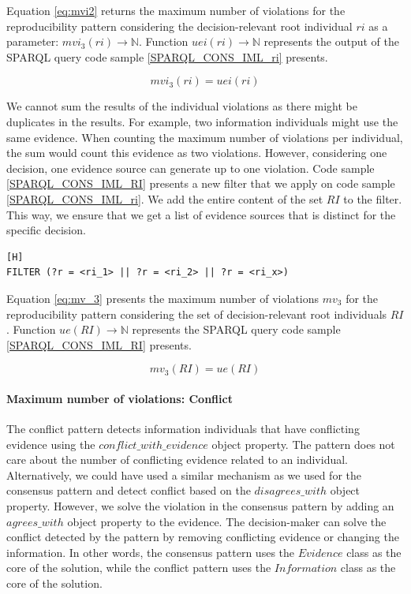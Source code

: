 Equation \ref{eq:mvi2} returns the maximum number of violations for the reproducibility pattern considering the decision-relevant root individual $ri$ as a parameter: $mvi_3(ri) \rightarrow \mathbb{N}$. Function $uei(ri) \rightarrow \mathbb{N}$ represents the output of the SPARQL query code sample \ref{SPARQL_CONS_IML_ri} presents.

\begin{equation} \label{eq:mvi3}
mvi_3(ri) = uei(ri)
\end{equation}

We cannot sum the results of the individual violations as there might be duplicates in the results. For example, two information individuals might use the same evidence. When counting the maximum number of violations per individual, the sum would count this evidence as two violations. However, considering one decision, one evidence source can generate up to one violation. Code sample \ref{SPARQL_CONS_IML_RI} presents a new filter that we apply on code sample \ref{SPARQL_CONS_IML_ri}. We add the entire content of the set $RI$ to the filter. This way, we ensure that we get a list of evidence sources that is distinct for the specific decision.

\begin{lstlisting}[float,language=SPARQL1,caption={A new filter that we apply on code sample \ref{SPARQL_CONS_IML_ri}. We add the entire content of the set $RI$ to the filter.},label={SPARQL_CONS_IML_RI}][H]
FILTER (?r = <ri_1> || ?r = <ri_2> || ?r = <ri_x>)
\end{lstlisting}

Equation \ref{eq:mv_3} presents the maximum number of violations $mv_3$ for the reproducibility pattern considering the set of decision-relevant root individuals $RI$. Function $ue(RI) \rightarrow \mathbb{N}$ represents the SPARQL query code sample \ref{SPARQL_CONS_IML_RI} presents.

\begin{equation} \label{eq:mv_3}
mv_3(RI) = ue(RI)
\end{equation}

\paragraph{Maximum number of violations: Conflict}
The conflict pattern detects information individuals that have conflicting evidence using the $conflict\_with\_evidence$ object property. The pattern does not care about the number of conflicting evidence related to an individual. Alternatively, we could have used a similar mechanism as we used for the consensus pattern and detect conflict based on the $disagrees\_with$ object property. However, we solve the violation in the consensus pattern by adding an $agrees\_with$ object property to the evidence. The decision-maker can solve the conflict detected by the pattern by removing conflicting evidence or changing the information. In other words, the consensus pattern uses the $Evidence$ class as the core of the solution, while the conflict pattern uses the $Information$ class as the core of the solution.

